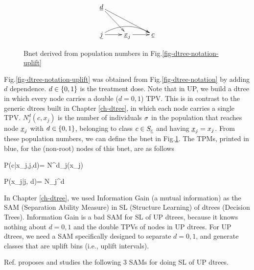 \begin{figure}
$$
\xymatrix{
\rvd\ar[dr]\ar[drr]
\\
\rvj
\ar[r]\ar@/^1pc/[rr]
&
\rvx_j\ar[r]
&
\rvc
}$$
\caption{Bnet derived from population
numbers in Fig.\ref{fig-dtree-notation-uplift}}
\label{fig-class-bnet-uplift}
\end{figure}



Fig.\ref{fig-dtree-notation-uplift}
was obtained from Fig.\ref{fig-dtree-notation}
by adding $d$ dependence.
$d\in \{0,1\}$
is the treatment dose.
Note that in UP, we build a dtree
in which every node carries a double ($d=0,1$)
TPV. This
is in contrast to the generic dtrees built
in Chapter \ref{ch-dtree}, in which 
each node carries a single TPV.
$N^d_j(c, x_j)$ is 
the number
of individuals $\sigma$
in the population that reaches node $\rvx_j$
with $d\in \{0,1\}$, belonging
to class $c\in S_\rvc$ and having $\rvx_j=x_j$. 
From these population numbers, we can define
the bnet in Fig.\ref{fig-class-bnet-uplift}.
The TPMs, printed in blue,
for the (non-root) nodes of this bnet, are as follows



\beq\color{blue}
P(c|x_j,j,d)=
{N^d_j(x_j)}
\label{eq-p-c-pre-laplace}
\eeq

\beq\color{blue}
P(x_j|j, d)=
{N_j^d}
\eeq


In Chapter
\ref{ch-dtree},
we used Information 
Gain
(a mutual information)
as the SAM (Separation Ability Measure)
in
SL (Structure Learning) 
of dtrees (Decision Trees).
Information Gain
is a bad
SAM for SL of UP dtrees,
because it knows nothing about
 $d=0,1$
and the double TPVs of nodes in UP dtrees.
For
UP dtrees,
we need a SAM specifically
designed to separate $d=0,1$, and generate 
classes that are
 uplift bins (i.e., uplift intervals).


Ref.\cite{jaros}
proposes and studies 
the following
3 SAMs 
for doing SL of UP dtrees.


